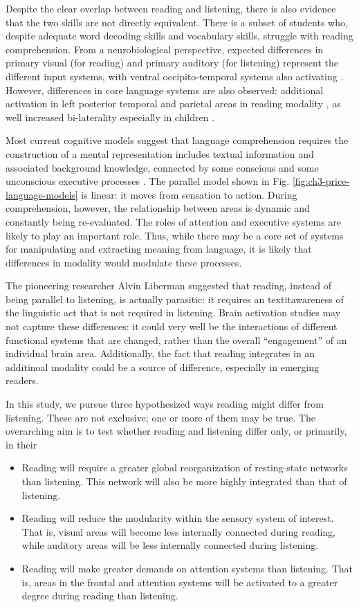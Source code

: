 Despite the clear overlap between reading and listening, there is also evidence that the two skills are not directly equivalent. There is a subset of students who, despite adequate word decoding skills and vocabulary skills, struggle with reading comprehension\citep{Pimperton2010, Spencer2014}. From a neurobiological perspective, expected differences in primary visual (for reading) and primary auditory (for listening) represent the different input systems, with ventral occipito-temporal systems also activating \citep{Jobard2007}. However, differences in core language systems are also observed: additional activation in left posterior temporal and parietal areas in reading modality \citep{Constable2004}, as well increased bi-laterality especially in children \citep{Berl2011}. 

Most current cognitive models suggest that language comprehension requires the construction of a mental representation includes textual information and associated background knowledge, connected by some conscious and some unconscious executive processes \citep{Kendeou2014}. The parallel model shown in Fig. \ref{fig:ch3-price-language-models} is linear: it moves from sensation to action. During comprehension, however, the relationship between areas is dynamic and constantly being re-evaluated. The roles of attention and executive systems are likely to play an important role. Thus, while there may be a core set of systems for manipulating and extracting meaning from language, it is likely that differences in modality would modulate these processes. 

The pioneering researcher Alvin Liberman suggested that reading, instead of being parallel to listening, is actually parasitic: it requires an textit{awareness} of the linguistic act that is not required in listening. Brain activation studies may not capture these differences: it could very well be the interactions of different functional systems that are changed, rather than the overall ``engagement'' of an individual brain area. Additionally, the fact that reading integrates in an additinoal modality could be a source of difference, especially in emerging readers. 

In this study, we pursue three hypothesized ways reading might differ from listening. These are not exclusive; one or more of them may be true. The overarching aim is to test whether reading and listening differ only, or primarily, in their 

\begin{itemize}
	\item Reading will require a greater global reorganization of resting-state networks than listening. This network will also be more highly integrated than that of listening. 
	\item Reading will reduce the modularity within the sensory system of interest. That is, visual areas will become less internally connected during reading, while auditory areas will be less internally connected during listening.
	\item Reading will make greater demands on attention systems than listening. That is, areas in the frontal and attention systems will be activated to a greater degree during reading than listening.
\end{itemize}


